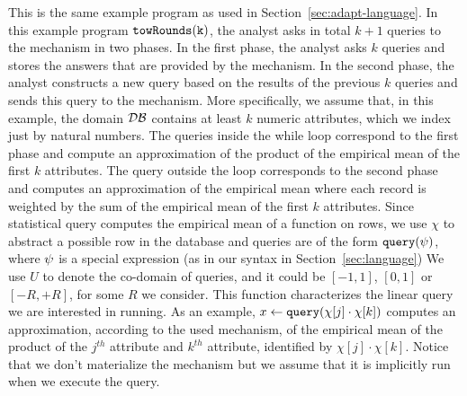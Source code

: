 \begin{example}[twoRounds]
    This is the same example program as used in Section~\ref{sec:adapt-language}.
    In this example program $\mathtt{towRounds(k)}$, the analyst asks in total $k+1$ queries to the mechanism in two phases.
    In the first phase, the analyst asks $k$ queries and stores the answers that are provided by the mechanism. 
    In the second phase, the analyst constructs a new query based on the results of the previous $k$ queries and sends this query to the mechanism. More specifically, we assume that, in this example, the domain $\mathcal{DB}$ 
    contains at least $k$ numeric attributes, which we index just by natural numbers. 
    The queries inside the while loop correspond to the first phase and compute an approximation of 
    the product of the empirical mean of the first $k$ attributes. 
    The query outside the loop corresponds to the second phase and computes an approximation of the empirical mean where each record is weighted by the sum of the empirical mean of the first $k$ attributes.
    {Since statistical query computes the empirical mean of a function on rows, we use $\chi$ to abstract a possible row in the database and }
    queries are of the form ${\tt query}(\psi)$, where $\psi$ is a special expression 
    (as in our syntax in Section~\ref{sec:language})
    {
      We use $U$ to denote the co-domain of queries, and it could be $[-1,1]$, $[0,1]$ or $[-R,+R]$, for some $R$ we consider.
      This function characterizes the linear query we are interested in running. 
      As an example, $x \leftarrow {\tt query}(\chi[j] \cdot \chi[k])$ computes an approximation, according to the used mechanism, of the empirical mean of the product of the $j^{th}$ attribute and $k^{th}$ attribute, identified by $\chi[j] \cdot \chi[k]$. Notice that we don't materialize the mechanism but we assume that it is implicitly run when we execute the query. } 


\end{example}
